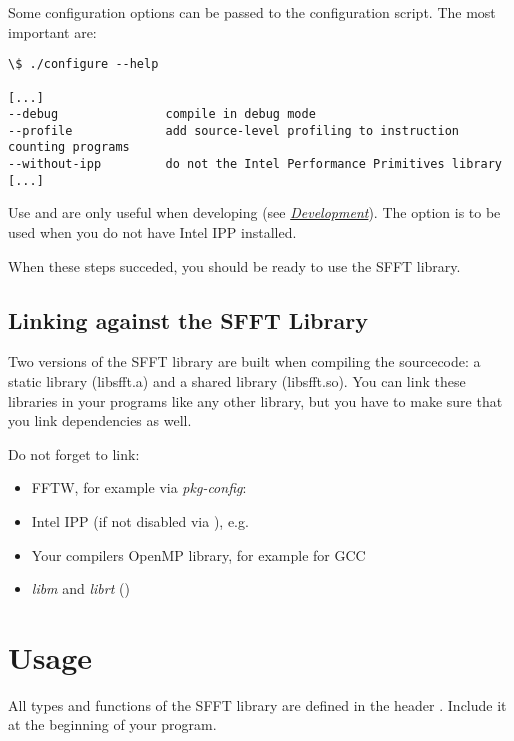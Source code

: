 \documentclass[letterpaper,10pt,english]{sphinxmanual}
\begin{document}
Some configuration options can be passed to the configuration script. The most
important are:

\begin{Verbatim}[commandchars=\\\{\}]
\$ ./configure --help

[...]
--debug               compile in debug mode
--profile             add source-level profiling to instruction counting programs
--without-ipp         do not the Intel Performance Primitives library
[...]
\end{Verbatim}

Use  and  are only useful when developing (see
{\hyperref[development:development]{\emph{Development}}}). The option  is to be used when you do not have
Intel IPP installed.

When these steps succeded, you should be ready to use the SFFT library.


\section{Linking against the SFFT Library}
\label{installation:linking-against-the-sfft-library}
Two versions of the SFFT library are built when compiling the sourcecode:
a static library (libsfft.a) and a shared library (libsfft.so). You can link
these libraries in your programs like any other library, but you have to make
sure that you link dependencies as well.

Do not forget to link:
\begin{itemize}
\item {} 
FFTW, for example via \emph{pkg-config}: 

\item {} 
Intel IPP (if not disabled via ),
e.g. 

\item {} 
Your compilers OpenMP library, for example  for GCC

\item {} 
\emph{libm} and \emph{librt} ()

\end{itemize}


\chapter{Usage}
\label{usage:usage}\label{usage::doc}
All types and functions of the SFFT library are defined in the header
. Include it at the beginning of your program.
\end{document}
